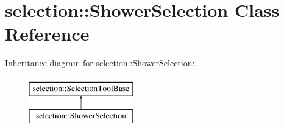 \hypertarget{classselection_1_1ShowerSelection}{}\section{selection\+:\+:Shower\+Selection Class Reference}
\label{classselection_1_1ShowerSelection}
Inheritance diagram for selection\+:\+:Shower\+Selection\+:\begin{figure}[H]
\begin{center}
\leavevmode
\includegraphics[height=2.000000cm]{classselection_1_1ShowerSelection}
\end{center}
\end{figure}
